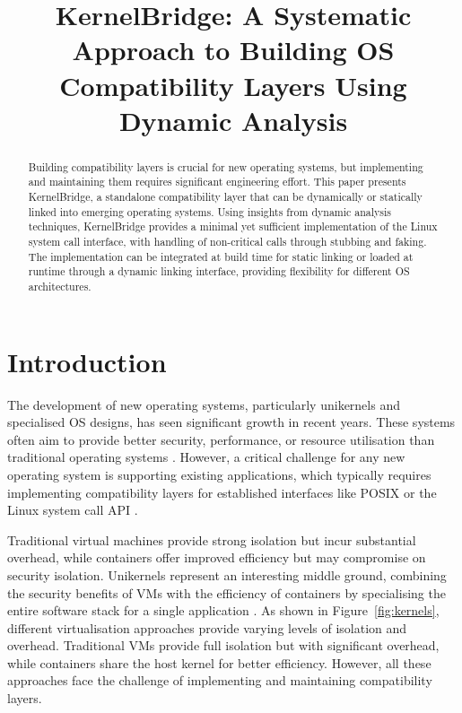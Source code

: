 \documentclass[conference]{IEEEtran}
\begin{document}
\title{KernelBridge: A Systematic Approach to Building OS Compatibility Layers Using Dynamic Analysis}

\author{
	}

\maketitle

\begin{abstract}
	Building compatibility layers is crucial for new operating systems, but implementing and
	maintaining them requires significant engineering effort. This paper presents KernelBridge, a
	standalone compatibility layer that can be dynamically or statically linked into emerging
	operating systems. Using insights from dynamic analysis techniques, KernelBridge provides a
	minimal yet sufficient implementation of the Linux system call interface, with
	handling of non-critical calls through stubbing and faking. The implementation can be integrated at build time for static linking or loaded at runtime through a dynamic linking interface, providing flexibility for different OS architectures.
\end{abstract}

\section{Introduction}
The development of new operating systems, particularly unikernels and specialised OS designs, has
seen significant growth in recent years. These systems often aim to provide better security,
performance, or resource utilisation than traditional operating systems \cite{madhavapeddy2015unikernels}. However, a critical challenge for any new operating system is supporting existing applications, which typically requires implementing compatibility layers for established interfaces like POSIX or the Linux system call API \cite{linux_kernel_clothing}.

Traditional virtual machines provide strong isolation but incur substantial overhead, while
containers offer improved efficiency but may compromise on security isolation. Unikernels represent
an interesting middle ground, combining the security benefits of VMs with the efficiency of
containers by specialising the entire software stack for a single application
\cite{unikernels_vs_containers}. As shown in Figure~\ref{fig:kernels}, different virtualisation approaches provide varying levels of isolation and overhead. Traditional VMs provide full isolation but with significant overhead, while containers share the host kernel for better efficiency. However, all these approaches face the challenge of implementing and maintaining compatibility layers.
\end{document}
